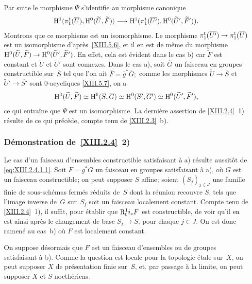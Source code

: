 Par suite le morphisme $\overline{\Psi}$ s'identifie au morphisme
canonique
$$
\H^1(\pi_1^{\tame}(\overline{U}),\H^0(\widetilde{U},\widetilde{F}))
\to
\H^1(\pi_1^{\tame}(\overline{U'}),\H^0(\widetilde{U}',\widetilde{F}')).
$$
Montrons
que ce morphisme est un isomorphisme. Le morphisme
$\pi_1^{\tame}(\overline{U'})\to\pi_1^{\tame}(\overline{U})$
est un isomorphisme d'apr\`es~\ref{XIII.5.6}, et il en est de
m\^eme du morphisme $\H^0(\widetilde{U},\widetilde{F})\to
\H^0(\widetilde{U}',\widetilde{F}')$. En effet, cela est \'evident
dans le cas b) car $\widetilde{F}$ est constant et $\widetilde{U}$ et
$\widetilde{U}'$ sont connexes. Dans le cas a), soit $\overline{G}$ un
faisceau en groupes constructible sur~$\overline{S}$ tel que l'on ait
$\overline{F}=\overline{g}^*\overline{G};$ comme les morphismes
$\widetilde{U}\to\overline{S}$ et
$\widetilde{U}'\to\overline{S'}$ sont $0$-acycliques
\eqref{XIII.5.7}, on a
$$
\mathrm{H}^0(\widetilde{U},\widetilde{F})\simeq
\mathrm{H}^0(\overline{S},\overline{G}) \simeq
\mathrm{H}^0(\overline{S'},\overline{G'})\simeq
\mathrm{H}^0(\widetilde{U}',\widetilde{F}'),
$$
ce qui entra\^ine que $\Psi$ est un isomorphisme. La derni\`ere
assertion de \ref{XIII.2.4}~1) r\'esulte de ce qui pr\'ec\`ede,
compte tenu de \ref{XIII.2.3}~b).

\subsubsection*{D\'emonstration de~\ref{XIII.2.4}~\textup{2)}}

Le cas d'un faisceau d'ensembles constructible satisfaisant \`a a)
r\'esulte aussit\^ot de \eqref{eq:XIII.2.4.1.1}. Soit $F=g^*G$ un
faisceau en groupes satisfaisant \`a a), o\`u $G$ est un faisceau
constructible; on peut supposer $S$ affine; soient $(S_j)_{j\in J}$
une famille finie de sous-sch\'emas ferm\'es r\'eduits de~$S$
dont la r\'eunion recouvre $S$, tels que l'image inverse de~$G$ sur~$S_j$ soit un faisceau localement constant. Compte tenu de
\ref{XIII.2.4}~1), il suffit, pour \'etablir que $\mathrm{R}^1_{\mathrm{t}}i_*F$
est constructible, de voir qu'il en est ainsi apr\`es le changement
de base $S_j\to S$, pour chaque $j\in J$. On est donc
ramen\'e au cas~b) o\`u $F$ est localement constant.

On suppose d\'esormais que $F$ est un faisceau d'ensembles ou de
groupes satisfaisant \`a b). Comme la question est locale pour la
topologie \'etale sur~$X$, on peut supposer $X$ de pr\'esentation
finie sur~$S$, et, par passage \`a la limite, on peut supposer $X$
et $S$ noeth\'eriens.

